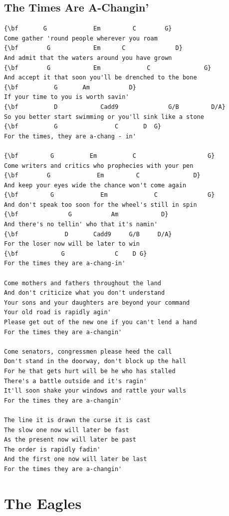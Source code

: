 \documentclass[a4paper]{article}
\begin{document}
\subsection{The Times Are A-Changin'}
\begin{Verbatim}[commandchars=\\\{\}]
{\bf       G             Em         C        G}
Come gather 'round people wherever you roam
{\bf        G            Em      C              D}
And admit that the waters around you have grown
{\bf        G            Em             C               G}
And accept it that soon you'll be drenched to the bone
{\bf          G       Am           D}
If your time to you is worth savin'
{\bf          D            Cadd9              G/B         D/A}
So you better start swimming or you'll sink like a stone
{\bf          G                C       D  G}
For the times, they are a-chang - in'

{\bf         G          Em          C                    G}
Come writers and critics who prophecies with your pen
{\bf        G             Em         C               D}
And keep your eyes wide the chance won't come again
{\bf         G             Em             C              G}
And don't speak too soon for the wheel's still in spin
{\bf              G           Am            D}
And there's no tellin' who that it's namin'
{\bf             D       Cadd9     G/B     D/A}
For the loser now will be later to win
{\bf            G              C    D G}
For the times they are a-chang-in'

Come mothers and fathers throughout the land
And don't criticize what you don't understand
Your sons and your daughters are beyond your command
Your old road is rapidly agin'
Please get out of the new one if you can't lend a hand
For the times they are a-changin'

Come senators, congressmen please heed the call
Don't stand in the doorway, don't block up the hall
For he that gets hurt will be he who has stalled
There's a battle outside and it's ragin'
It'll soon shake your windows and rattle your walls
For the times they are a-changin'

The line it is drawn the curse it is cast
The slow one now will later be fast
As the present now will later be past
The order is rapidly fadin'
And the first one now will later be last
For the times they are a-changin'

\end{Verbatim}
\newpage
\section{The Eagles}
\end{document}

